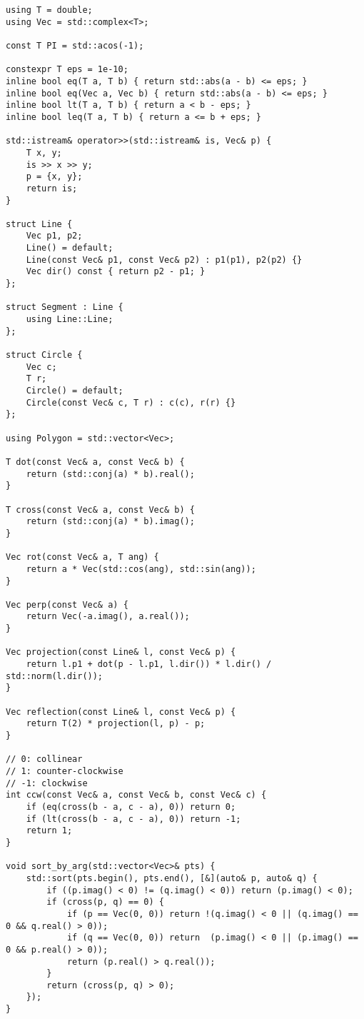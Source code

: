 \begin{lstlisting}
using T = double;
using Vec = std::complex<T>;

const T PI = std::acos(-1);

constexpr T eps = 1e-10;
inline bool eq(T a, T b) { return std::abs(a - b) <= eps; }
inline bool eq(Vec a, Vec b) { return std::abs(a - b) <= eps; }
inline bool lt(T a, T b) { return a < b - eps; }
inline bool leq(T a, T b) { return a <= b + eps; }

std::istream& operator>>(std::istream& is, Vec& p) {
    T x, y;
    is >> x >> y;
    p = {x, y};
    return is;
}

struct Line {
    Vec p1, p2;
    Line() = default;
    Line(const Vec& p1, const Vec& p2) : p1(p1), p2(p2) {}
    Vec dir() const { return p2 - p1; }
};

struct Segment : Line {
    using Line::Line;
};

struct Circle {
    Vec c;
    T r;
    Circle() = default;
    Circle(const Vec& c, T r) : c(c), r(r) {}
};

using Polygon = std::vector<Vec>;

T dot(const Vec& a, const Vec& b) {
    return (std::conj(a) * b).real();
}

T cross(const Vec& a, const Vec& b) {
    return (std::conj(a) * b).imag();
}

Vec rot(const Vec& a, T ang) {
    return a * Vec(std::cos(ang), std::sin(ang));
}

Vec perp(const Vec& a) {
    return Vec(-a.imag(), a.real());
}

Vec projection(const Line& l, const Vec& p) {
    return l.p1 + dot(p - l.p1, l.dir()) * l.dir() / std::norm(l.dir());
}

Vec reflection(const Line& l, const Vec& p) {
    return T(2) * projection(l, p) - p;
}

// 0: collinear
// 1: counter-clockwise
// -1: clockwise
int ccw(const Vec& a, const Vec& b, const Vec& c) {
    if (eq(cross(b - a, c - a), 0)) return 0;
    if (lt(cross(b - a, c - a), 0)) return -1;
    return 1;
}

void sort_by_arg(std::vector<Vec>& pts) {
    std::sort(pts.begin(), pts.end(), [&](auto& p, auto& q) {
        if ((p.imag() < 0) != (q.imag() < 0)) return (p.imag() < 0);
        if (cross(p, q) == 0) {
            if (p == Vec(0, 0)) return !(q.imag() < 0 || (q.imag() == 0 && q.real() > 0));
            if (q == Vec(0, 0)) return  (p.imag() < 0 || (p.imag() == 0 && p.real() > 0));
            return (p.real() > q.real());
        }
        return (cross(p, q) > 0);
    });
}
\end{lstlisting}


